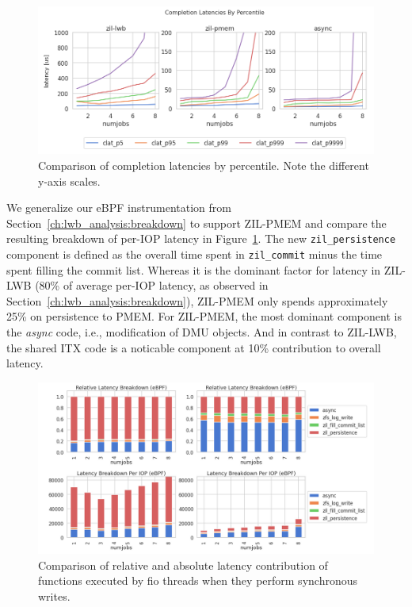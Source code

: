 \documentclass[12pt,a4paper,twoside]{book}
\begin{document}
\begin{figure}[H]
    \centering
    \includegraphics[width=\textwidth]{fig/evaluation/motivating_fio_benchmark__tail_latencies}
    \caption{Comparison of completion latencies by percentile. Note the different y-axis scales.}
\end{figure}

We generalize our eBPF instrumentation from Section~\ref{ch:lwb_analysis:breakdown} to support ZIL-PMEM and compare the resulting breakdown of per-IOP latency in Figure~\ref{fig:eval:fio4k:breakdown}.
The new \lstinline{zil_persistence} component is defined as the overall time spent in \lstinline{zil_commit} minus the time spent filling the commit list.
Whereas it is the dominant factor for latency in ZIL-LWB (80\% of average per-IOP latency, as observed in Section~\ref{ch:lwb_analysis:breakdown}), ZIL-PMEM only spends approximately 25\% on persistence to PMEM.
For ZIL-PMEM, the most dominant component is the \textit{async} code, i.e., modification of DMU objects.
And in contrast to ZIL-LWB, the shared ITX code is a noticable component at 10\% contribution to overall latency.

\begin{figure}[H]
    \centering
    \includegraphics[width=\textwidth]{fig/evaluation/comparison_zil_overhead_lwb_vs_pmem}
    \caption{Comparison of relative and absolute latency contribution of functions executed by fio threads when they perform synchronous writes.}
    \label{fig:eval:fio4k:breakdown}
\end{figure}
\end{document}

